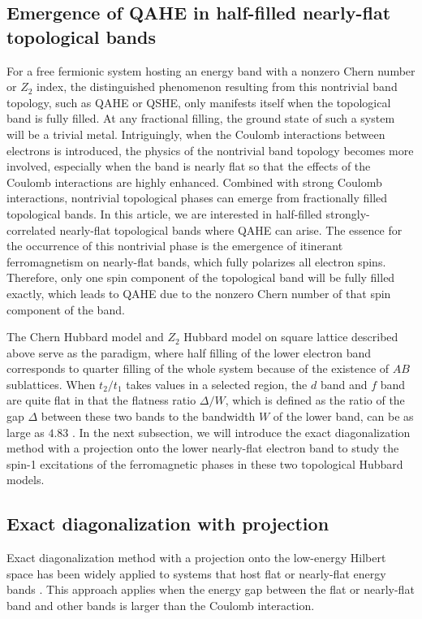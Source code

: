 \documentclass[amsmath,superscriptaddress,showpacs,aps,prb,twocolumn]{revtex4-1}
\begin{document}
\subsection{Emergence of QAHE in half-filled nearly-flat topological bands}\label{emerg_qahe}
\par For a free fermionic system hosting an energy band with a nonzero Chern number or $Z_2$ index, the distinguished phenomenon resulting from this nontrivial band topology, such as QAHE or QSHE, only manifests itself when the topological band is fully filled. At any fractional filling, the ground state of such a system will be a trivial metal. Intriguingly, when the Coulomb interactions between electrons is introduced, the physics of the nontrivial band topology becomes more involved, especially when the band is nearly flat so that the effects of the Coulomb interactions are highly enhanced. Combined with strong Coulomb interactions, nontrivial topological phases can emerge from fractionally filled topological bands. In this article, we are interested in half-filled strongly-correlated nearly-flat topological bands where QAHE can arise\cite{NSCM_PRL2011,DG_PRB2015}. The essence for the occurrence of this nontrivial phase is the emergence of itinerant ferromagnetism on nearly-flat bands\cite{T_PTP1998}, which fully polarizes all electron spins. Therefore, only one spin component of the topological band will be fully filled exactly, which leads to QAHE due to the nonzero Chern number of that spin component of the band.

\par The Chern Hubbard model and $Z_2$ Hubbard model on square lattice described above serve as the paradigm, where half filling of the lower electron band corresponds to quarter filling of the whole system because of the existence of $AB$ sublattices. When $t_2/t_1$ takes values in a selected region, the $d$ band and $f$ band are quite flat in that the flatness ratio $\Delta/W$, which is defined as the ratio of the gap $\Delta$ between these two bands to the bandwidth $W$ of the lower band, can be as large as $4.83$ \cite{NSCM_PRL2011,DG_PRB2015}. In the next subsection, we will introduce the exact diagonalization method with a projection onto the lower nearly-flat electron band to study the spin-1 excitations of the ferromagnetic phases in these two topological Hubbard models.

\subsection{Exact diagonalization with projection}\label{exact_diag_proj}
\par Exact diagonalization method with a projection onto the low-energy Hilbert space has been widely applied to systems that host flat or nearly-flat energy bands \cite{NSCM_PRL2011,RB_PRX2011,NSRCM_PRB2011,SGDL_PRB2018,NSRCM_PRL2012,DG_PRB2015}. This approach applies when the energy gap between the flat or nearly-flat band and other bands is larger than the Coulomb interaction.
\end{document}
